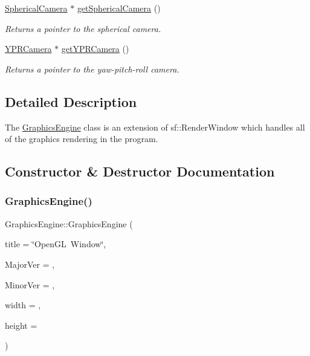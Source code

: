 \begin{DoxyCompactItemize}
\hyperlink{class_spherical_camera}{Spherical\+Camera} $\ast$ \hyperlink{class_graphics_engine_a08fa5ea5485b0bab2d902dd71ac995d9}{get\+Spherical\+Camera} ()
\begin{DoxyCompactList}\small\item\em Returns a pointer to the spherical camera. \end{DoxyCompactList}\item 
\mbox{\label{class_graphics_engine_a99c1b6f36ce3c8e02cba2a97b08eab05}} 
\hyperlink{class_y_p_r_camera}{Y\+P\+R\+Camera} $\ast$ \hyperlink{class_graphics_engine_a99c1b6f36ce3c8e02cba2a97b08eab05}{get\+Y\+P\+R\+Camera} ()
\begin{DoxyCompactList}\small\item\em Returns a pointer to the yaw-\/pitch-\/roll camera. \end{DoxyCompactList}\end{DoxyCompactItemize}


\subsection{Detailed Description}
The \hyperlink{class_graphics_engine}{Graphics\+Engine} class is an extension of sf\+::\+Render\+Window which handles all of the graphics rendering in the program. 

\subsection{Constructor \& Destructor Documentation}
\mbox{\label{class_graphics_engine_a458fa2b36f864e0820a0a54ad58ff1c3}} 
\subsubsection{\texorpdfstring{Graphics\+Engine()}{GraphicsEngine()}}
{\footnotesize\ttfamily Graphics\+Engine\+::\+Graphics\+Engine (\begin{DoxyParamCaption}\item[{std\+::string}]{title = {\ttfamily \char`\"{}OpenGL~Window\char`\"{}},  }\item[{G\+Lint}]{Major\+Ver = {},  }\item[{G\+Lint}]{Minor\+Ver = {},  }\item[{int}]{width = {},  }\item[{int}]{height = {} }\end{DoxyParamCaption})}



